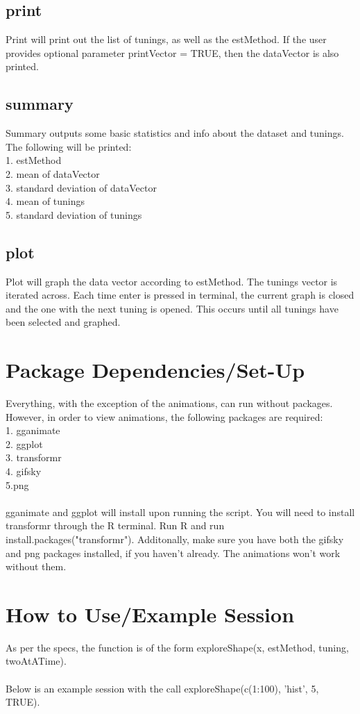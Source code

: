 \documentclass{article}
\begin{document}
\subsection{print}
Print will print out the list of tunings, as well as the estMethod. If the user provides optional parameter printVector = TRUE, then the dataVector is also printed.

\subsection{summary}
Summary outputs some basic statistics and info about the dataset and tunings. The following will be printed:\\
1. estMethod\\
2. mean of dataVector\\
3. standard deviation of dataVector\\
4. mean of tunings\\
5. standard deviation of tunings

\subsection{plot}
Plot will graph the data vector according to estMethod. The tunings vector is iterated across. Each time enter is pressed in terminal, the current graph is closed and the one with the next tuning is opened. This occurs until all tunings have been selected and graphed.

\section{Package Dependencies/Set-Up}
Everything, with the exception of the animations, can run without packages. However, in order to view animations, the following packages are required:\\
1. gganimate\\
2. ggplot\\
3. transformr\\
4. gifsky\\
5.png\\\\
gganimate and ggplot will install upon running the script. You will need to install transformr through the R terminal. Run R and run install.packages("transformr"). Additonally, make sure you have both the gifsky and png packages installed, if you haven't already. The animations won't work without them.

\section{How to Use/Example Session}
As per the specs, the function is of the form exploreShape(x, estMethod, tuning, twoAtATime).\\\\
Below is an example session with the call exploreShape(c(1:100), 'hist', 5, TRUE). \\ 
\end{document}
